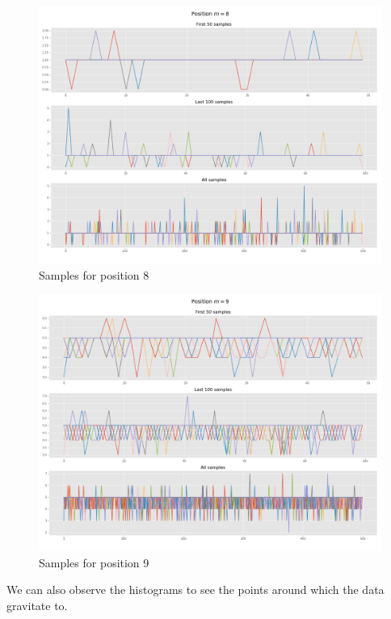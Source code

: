 \documentclass[]{article}
\begin{document}
	\begin{figure}[H]
		\begin{center}
			
			\includegraphics[width=.7\textwidth]{task4/figures/T_2_4/Q2/convergence_pos8.png}
			\caption*{Samples for position 8}
		\end{center}
	\end{figure}
	
	\begin{figure}[H]
		\begin{center}
			
			\includegraphics[width=.7\textwidth]{task4/figures/T_2_4/Q2/convergence_pos9.png}
			\caption*{Samples for position 9}
		\end{center}
	\end{figure}
	
	\newpage
	
	We can also observe the histograms to see the points around which the data gravitate to.
	
\end{document}
